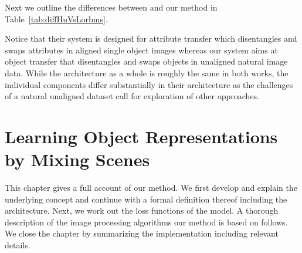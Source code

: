 \documentclass[a4paper,12pt]{report}
\begin{document}
Next we outline the differences between \cite{DisentFacOfVarByMixTh} and our method in Table~\ref{tab:diffHuVsLorbms}.
\begin{table} [H]
\centering
{}
\caption{Differences between \cite{DisentFacOfVarByMixTh} and our method.} \label{tab:diffHuVsLorbms}
\end{table}
Notice that their system is designed for attribute transfer which disentangles and swaps attributes in aligned single object images whereas our system aims at object transfer that disentangles and swaps objects in unaligned natural image data. While the architecture as a whole is roughly the same in both works, the individual components differ substantially in their architecture as the challenges of a natural unaligned dataset call for exploration of other approaches.


%
\chapter{Learning Object Representations by Mixing Scenes}\label{sec:lorbms_method}
This chapter gives a full account of our method. We first develop and explain the underlying concept and continue with a formal definition thereof including the architecture. Next, we work out the loss functions of the model. A thorough description of the image processing algorithms our method is based on follows. We close the chapter by summarizing the implementation including relevant details. 
\end{document}
